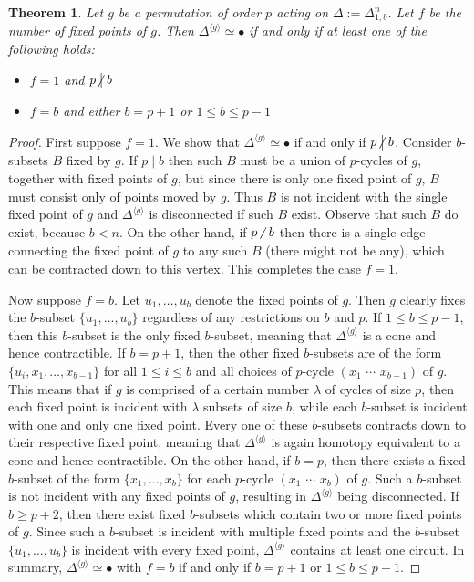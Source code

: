\documentclass[12pt]{amsart}
\theoremstyle{plain}
\newtheorem{theorem}{Theorem}[section]
\theoremstyle{definition}
\theoremstyle{remark}
\numberwithin{equation}{section}
\newcommand{\notdivide}{\kern-2.1pt\not\kern2.1pt\bigm|}
\begin{document}
\begin{theorem}\label{thm:fps_1b}
    Let $g$ be a permutation of order $p$ acting on $\Delta:=\Delta_{1,b}^n$. Let $f$ be the number of fixed points of $g$. Then $\Delta^{\langle g\rangle}\simeq \bullet$ if and only if at least one of the following holds:
    \begin{itemize}
        \item $f=1$ and $p\notdivide b$
        \item $f=b$ and either $b=p+1$ or $1\leq b\leq p-1$
    \end{itemize}
\end{theorem}
\begin{proof}
First suppose $f=1$. We show that $\Delta^{\langle g\rangle}\simeq \bullet$ if and only if $p\notdivide b$.
    Consider $b$-subsets $B$ fixed by $g$.
    If $p\mid b$ then such $B$ must be a union of $p$-cycles of $g$, together with fixed points of $g$, but since there is only one fixed point of $g$, $B$ must consist only of points moved by $g$. Thus $B$ is not incident with the single fixed point of $g$ and $\Delta^{\langle g\rangle}$ is disconnected if such $B$ exist. Observe that such $B$ do exist, because $b<n$. On the other hand, if $p\notdivide b$ then there is a single edge connecting the fixed point of $g$ to any such $B$ (there might not be any), which can be contracted down to this vertex. This completes the case $f=1$.  

    Now suppose $f=b$. Let $u_1,\ldots,u_b$ denote the fixed points of $g$. Then $g$ clearly fixes the $b$-subset $\{u_1,\ldots,u_b\}$ regardless of any restrictions on $b$ and $p$. If $1\leq b\leq p-1$, then this $b$-subset is the only fixed $b$-subset, meaning that $\Delta^{\langle g\rangle}$ is a cone and hence contractible. If $b=p+1$, then the other fixed $b$-subsets are of the form $\{u_i, x_1,\ldots, x_{b-1}\}$ for all $1\leq i \leq b$ and all choices of $p$-cycle $(x_1\,\,\cdots\,\,x_{b-1})$ of $g$. This means that if $g$ is comprised of a certain number $\lambda$ of cycles of size $p$, then each fixed point is incident with $\lambda$ subsets of size $b$, while each $b$-subset is incident with one and only one fixed point. Every one of these $b$-subsets contracts down to their respective fixed point, meaning that $\Delta^{\langle g\rangle}$ is again homotopy equivalent to a cone and hence contractible. On the other hand, if $b=p$, then there exists a fixed $b$-subset of the form $\{x_1,\ldots, x_b\}$ for each $p$-cycle $(x_1\,\,\cdots\,\,x_b)$ of $g$. Such a $b$-subset is not incident with any fixed points of $g$, resulting in $\Delta^{\langle g\rangle}$ being disconnected. If $b\geq p+2$, then there exist fixed $b$-subsets which contain two or more fixed points of $g$. Since such a $b$-subset is incident with multiple fixed points and the $b$-subset $\{u_1,\ldots,u_b\}$ is incident with every fixed point, $\Delta^{\langle g\rangle}$ contains at least one circuit. In summary, $\Delta^{\langle g\rangle}\simeq\bullet$ with $f=b$ if and only if $b=p+1$ or $1\leq b\leq p-1$.


\end{proof}
\end{document}
